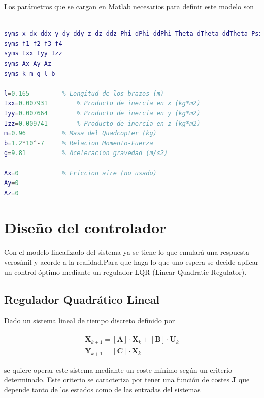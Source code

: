 \documentclass[twoside,11pt]{book}
\begin{document}
Los parámetros que se cargan en Matlab necesarios para definir este modelo son
\begin{lstlisting}[language=Matlab]
% Declaracion simbolica de las variables

syms x dx ddx y dy ddy z dz ddz Phi dPhi ddPhi Theta dTheta ddTheta Psi dPsi ddPsi
syms f1 f2 f3 f4 
syms Ixx Iyy Izz
syms Ax Ay Az 
syms k m g l b

l=0.165			% Longitud de los brazos (m)
Ixx=0.007931		% Producto de inercia en x (kg*m2)
Iyy=0.007664		% Producto de inercia en y (kg*m2)
Izz=0.009741		% Producto de inercia en z (kg*m2)
m=0.96			% Masa del Quadcopter (kg)
b=1.2*10^-7		% Relacion Momento-Fuerza
g=9.81			% Aceleracion gravedad (m/s2)

Ax=0			% Friccion aire (no usado)
Ay=0
Az=0
\end{lstlisting}


\newpage
\chapter{Diseño del controlador} \label{control}

Con el modelo linealizado del sistema ya se tiene lo que emulará una respuesta verosímil y acorde a la realidad.Para que haga lo que uno espera  se decide aplicar un control óptimo mediante un regulador LQR (Linear Quadratic Regulator). \\

\section{Regulador Quadrático Lineal}

Dado un sistema lineal de tiempo discreto definido por 

\begin{equation}
\begin{array}{l}
\dot{\mathbf{X}}_{k+1}=[\mathbf{A}] \cdot \mathbf{X}_{k} + [\mathbf{B}] \cdot \mathbf{U}_{k} \\
\mathbf{Y}_{k+1} = [\mathbf{C}] \cdot \mathbf{X}_{k} 
\end{array}
\end{equation} 

se quiere operar este sistema mediante un coste mínimo según un criterio determinado. Este criterio se caracteriza por tener una función de costes $\mathbf{J}$ que depende tanto de los estados como de las entradas del sistemas \cite{LQR_Wikipedia}
\end{document}
